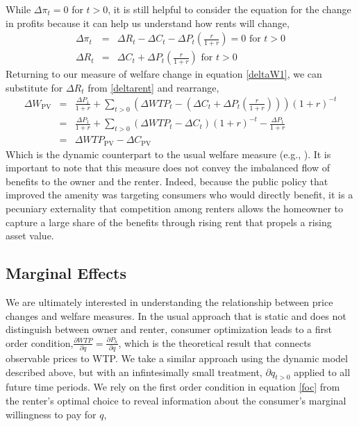 \documentclass[ecta,nameyear,draft]{econsocart}
\theoremstyle{plain}
\theoremstyle{remark}
\begin{document}
While $\Delta\pi_t=0$ for $t>0$, it is still helpful to consider the equation for the change in profits because it can help us understand how rents will change,
\begin{eqnarray}
	\Delta \pi_t &=& \Delta R_t-\Delta C_t-\Delta P_t\left(\frac{r}{1+r}\right)=0 \text{ for } t>0\nonumber\\
	\Delta R_t &=& \Delta C_t+\Delta P_t \left(\frac{r}{1+r}\right)  \text{ for } t>0\label{deltarent}
\end{eqnarray}
Returning to our measure of welfare change in equation \ref{deltaW1}, we can substitute for $\Delta R_t$  from \ref{deltarent} and rearrange,
\begin{eqnarray}
	\Delta W_{\mathrm{PV}}&=&\frac{\Delta P_1}{1+r}+\sum_{t>0} \left(\Delta \mathit{WTP}_t-\left(\Delta C_t+\Delta P_t \left(\frac{r}{1+r}\right)\right)\right)(1+r)^{-t} \nonumber\\
	&=&\frac{\Delta P_1}{1+r}+\sum_{t>0} (\Delta \mathit{WTP}_t-\Delta C_t)(1+r)^{-t}-\frac{\Delta P_1}{1+r}\nonumber\\
	&=&\Delta \mathit{WTP}_{\mathrm{PV}}-\Delta C_{\mathrm{PV}} \label{deltaW2}
\end{eqnarray}
Which is the dynamic counterpart to the usual welfare measure (e.g., \cite{freeman14}). It is important to note that this measure does not convey the imbalanced flow of benefits to the owner and the renter. Indeed, because the public policy that improved the amenity was targeting consumers who would directly benefit, it is a pecuniary externality that competition among renters allows the homeowner to capture a large share of the benefits through rising rent that propels a rising asset value.

\subsection{Marginal Effects}
We are ultimately interested in understanding the relationship between price changes and welfare measures. In the usual approach that is static and does not distinguish between owner and renter, consumer optimization leads to a first order condition,$\frac{\partial{\mathit{WTP}}}{\partial q}=\frac{\partial P_h}{\partial q}$, which is the theoretical result that connects observable prices to WTP. We take a similar approach using the dynamic model described above, but with an infintesimally small treatment, $\partial q_{t>0}$ applied to all future time periods. We rely on the first order condition in equation \ref{foc} from the renter's optimal choice to reveal information about the consumer's marginal willingness to pay for $q$,
\end{document}
